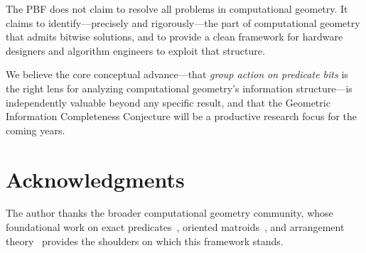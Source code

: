 \documentclass[11pt,letterpaper]{article}
\begin{document}
The PBF does not claim to resolve all problems in computational geometry.  It claims
to identify---precisely and rigorously---the part of computational geometry that admits
bitwise solutions, and to provide a clean framework for hardware designers and algorithm
engineers to exploit that structure.

We believe the core conceptual advance---that \emph{group action on predicate bits}
is the right lens for analyzing computational geometry's information structure---is
independently valuable beyond any specific result, and that the Geometric Information
Completeness Conjecture will be a productive research focus for the coming years.

\section*{Acknowledgments}

The author thanks the broader computational geometry community, whose foundational work
on exact predicates~\cite{Shewchuk97}, oriented matroids~\cite{Bjorner99}, and
arrangement theory~\cite{Basu06} provides the shoulders on which this framework stands.
\end{document}
